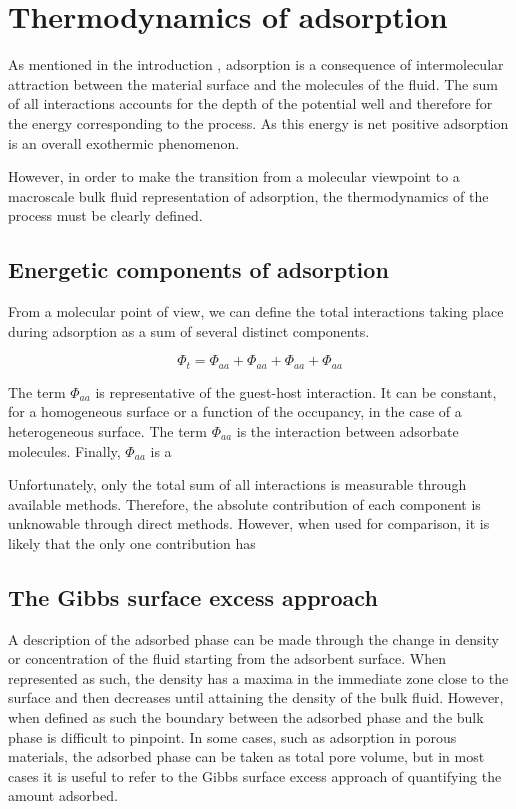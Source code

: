 
\section{Thermodynamics of adsorption}

As mentioned in the introduction , adsorption 
is a consequence of intermolecular attraction between the 
material surface and the molecules of the fluid. The sum of 
all interactions accounts for the depth of the potential 
well and therefore for the energy corresponding to the 
process. As this energy is net positive adsorption is an
overall exothermic phenomenon.

However, in order to make the transition from a molecular 
viewpoint to a macroscale bulk fluid representation of 
adsorption, the thermodynamics of the process must be 
clearly defined.


\subsection{Energetic components of adsorption}

From a molecular point of view, we can define the total
interactions taking place during adsorption as a sum of 
several distinct components.

\begin{equation}\label{calo:eqn:interactions}
  \Phi_t = \Phi_{aa} + \Phi_{aa} + \Phi_{aa} + \Phi_{aa}
\end{equation}

The term \(\Phi_{aa}\) is representative of the guest-host
interaction. It can be constant, for a homogeneous surface 
or a function of the occupancy, in the case of a 
heterogeneous surface. The term \(\Phi_{aa}\) is the interaction
between adsorbate molecules. Finally, \(\Phi_{aa}\) is 
a 

Unfortunately, only the total sum of all interactions
is measurable through available methods. Therefore, the 
absolute contribution of each component is unknowable 
through direct methods. However, when used for comparison,
it is likely that the only one contribution has 

\subsection{The Gibbs surface excess approach}

A description of the adsorbed phase can be made through the change
in density or concentration of the fluid starting from the 
adsorbent surface. When represented as such, the density 
has a maxima in the immediate zone close to the surface and then
decreases until attaining the density of the bulk fluid.
However, when defined as such the boundary between the 
adsorbed phase and the bulk phase is difficult to pinpoint.
In some cases, such as adsorption in porous materials, the 
adsorbed phase can be taken as total pore volume, but in 
most cases it is useful to refer to the Gibbs surface 
excess approach of quantifying the amount adsorbed.

